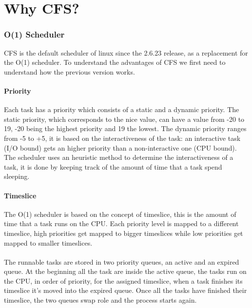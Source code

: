 \documentclass[10pt]{book}
\begin{document}
\label{sec:cfs}
\section{Why CFS?} 

\subsubsection{O(1) Scheduler}

CFS is the default scheduler of linux since the 2.6.23 release, as a replacement for the O(1) scheduler. To understand the advantages of CFS we first need to understand how the previous version works.

\paragraph{Priority} %
Each task has a priority which consists of a static and a dynamic priority. The static priority, which corresponds to the nice value, can have a value from -20 to 19, -20 being the highest priority and 19 the lowest. The dynamic priority ranges from -5 to +5, it is based on the interactiveness of the task: an interactive task (I/O bound) gets an higher priority than a non-interactive one (CPU bound). The scheduler uses an heuristic method to determine the interactiveness of a task, it is done by keeping track of the amount of time that a task spend sleeping.

\paragraph{Timeslice} %
The O(1) scheduler is based on the concept of timeslice, this is the amount of time that a task runs on the CPU. Each priority level is mapped to a different timeslice, high priorities get mapped to bigger timeslices while low priorities get mapped to smaller timeslices. 

\paragraph{} %
The runnable tasks are stored in two priority queues, an active and an expired queue. At the beginning all the task are inside the active queue, the tasks run on the CPU, in order of priority, for the assigned timeslice, when a task finishes its timeslice it's moved into the expired queue. Once all the tasks have finished their timeslice, the two queues swap role and the process starts again.
\end{document}
